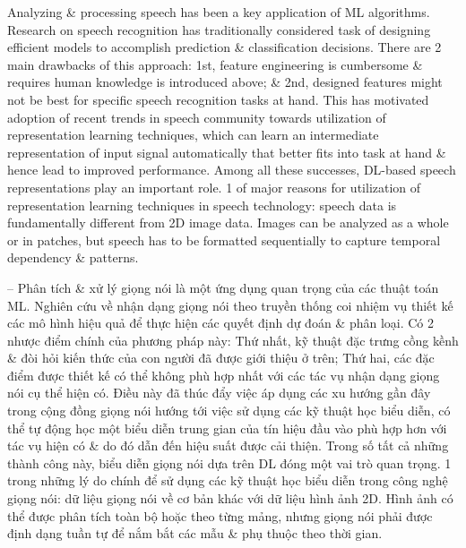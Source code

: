 \documentclass{article}
\begin{document}
\begin{itemize}
\begin{itemize}
\begin{itemize}
            Analyzing \& processing speech has been a key application of ML algorithms. Research on speech recognition has traditionally considered task of designing efficient models to accomplish prediction \& classification decisions. There are 2 main drawbacks of this approach: 1st, feature engineering is cumbersome \& requires human knowledge is introduced above; \& 2nd, designed features might not be best for specific speech recognition tasks at hand. This has motivated adoption of recent trends in speech community towards utilization of representation learning techniques, which can learn an intermediate representation of input signal automatically that better fits into task at hand \& hence lead to improved performance. Among all these successes, DL-based speech representations play an important role. 1 of major reasons for utilization of representation learning techniques in speech technology: speech data is fundamentally different from 2D image data. Images can be analyzed as a whole or in patches, but speech has to be formatted sequentially to capture temporal dependency \& patterns.

            -- Phân tích \& xử lý giọng nói là một ứng dụng quan trọng của các thuật toán ML. Nghiên cứu về nhận dạng giọng nói theo truyền thống coi nhiệm vụ thiết kế các mô hình hiệu quả để thực hiện các quyết định dự đoán \& phân loại. Có 2 nhược điểm chính của phương pháp này: Thứ nhất, kỹ thuật đặc trưng cồng kềnh \& đòi hỏi kiến thức của con người đã được giới thiệu ở trên; Thứ hai, các đặc điểm được thiết kế có thể không phù hợp nhất với các tác vụ nhận dạng giọng nói cụ thể hiện có. Điều này đã thúc đẩy việc áp dụng các xu hướng gần đây trong cộng đồng giọng nói hướng tới việc sử dụng các kỹ thuật học biểu diễn, có thể tự động học một biểu diễn trung gian của tín hiệu đầu vào phù hợp hơn với tác vụ hiện có \& do đó dẫn đến hiệu suất được cải thiện. Trong số tất cả những thành công này, biểu diễn giọng nói dựa trên DL đóng một vai trò quan trọng. 1 trong những lý do chính để sử dụng các kỹ thuật học biểu diễn trong công nghệ giọng nói: dữ liệu giọng nói về cơ bản khác với dữ liệu hình ảnh 2D. Hình ảnh có thể được phân tích toàn bộ hoặc theo từng mảng, nhưng giọng nói phải được định dạng tuần tự để nắm bắt các mẫu \& phụ thuộc theo thời gian.


\end{itemize}
\end{itemize}
\end{itemize}
\end{document}
